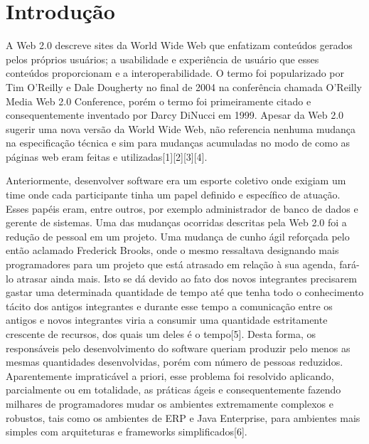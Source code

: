 \chapter{Introdução}

A Web 2.0 descreve sites da World Wide Web que enfatizam conteúdos gerados pelos próprios usuários; a usabilidade e experiência de usuário que esses conteúdos proporcionam e a interoperabilidade. O termo foi popularizado por Tim O'Reilly e Dale Dougherty no final de 2004 na conferência chamada O'Reilly Media Web 2.0 Conference, porém o termo foi primeiramente citado e consequentemente inventado por Darcy DiNucci em 1999. Apesar da Web 2.0 sugerir uma nova versão da World Wide Web, não referencia nenhuma mudança na especificação técnica e sim para mudanças acumuladas no modo de como as páginas web eram feitas e utilizadas[1][2][3][4].

	Anteriormente, desenvolver software era um esporte coletivo onde exigiam um time onde cada participante tinha um papel definido e específico de atuação. Esses papéis eram, entre outros, por exemplo administrador de banco de dados e gerente de sistemas. Uma das mudanças ocorridas descritas pela Web 2.0 foi a redução de pessoal em um projeto. Uma mudança de cunho ágil reforçada pelo então aclamado Frederick Brooks, onde o mesmo ressaltava designando mais programadores para um projeto que está atrasado em relação à sua agenda, fará-lo atrasar ainda mais. Isto se dá devido ao fato dos novos integrantes precisarem gastar uma determinada quantidade de tempo até que tenha todo o conhecimento tácito dos antigos integrantes e durante esse tempo a comunicação entre os antigos e novos integrantes viria a consumir uma quantidade estritamente crescente de recursos, dos quais um deles é o tempo[5]. Desta forma, os responsáveis pelo desenvolvimento do software queriam produzir pelo menos as mesmas quantidades desenvolvidas, porém com número de pessoas reduzidos. Aparentemente impraticável a priori, esse problema foi resolvido aplicando, parcialmente ou em totalidade, as práticas ágeis e consequentemente fazendo milhares de programadores mudar os ambientes extremamente complexos e robustos, tais como os ambientes de ERP e Java Enterprise, para ambientes mais simples com arquiteturas e frameworks simplificados[6].

